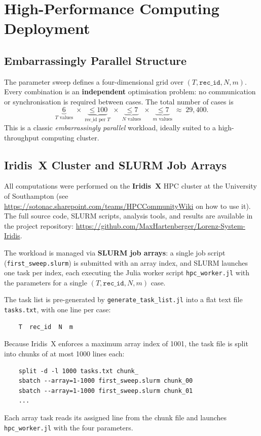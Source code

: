 \documentclass[11pt,a4paper]{article}
\begin{document}
\section{High-Performance Computing Deployment}

\subsection{Embarrassingly Parallel Structure}
The parameter sweep defines a four-dimensional grid over
$(T, \texttt{rec\_id}, N, m)$.  Every combination is an \textbf{independent}
optimisation problem: no communication or synchronisation is required between
cases.  The total number of cases is
\begin{equation}
  \underbrace{6}_{T\text{ values}}
  \;\times\;
  \underbrace{\le 100}_{\text{rec\_id per }T}
  \;\times\;
  \underbrace{\le 7}_{N\text{ values}}
  \;\times\;
  \underbrace{\le 7}_{m\text{ values}}
  \;\approx\; 29,\!400.
\end{equation}
This is a classic \emph{embarrassingly parallel} workload, ideally suited to
a high-throughput computing cluster.

\subsection{Iridis~X Cluster and SLURM Job Arrays}
All computations were performed on the \textbf{Iridis~X} HPC cluster at the
University of Southampton (see \url{https://sotonac.sharepoint.com/teams/HPCCommunityWiki} on how to use it).  The full source code, SLURM scripts, analysis
tools, and results are available in the project repository:
\url{https://github.com/MaxHartenberger/Lorenz-System-Iridis}.

The workload is managed via \textbf{SLURM job
arrays}: a single job script (\texttt{first\_sweep.slurm}) is submitted with
an array index, and SLURM launches one task per index, each executing the
Julia worker script \texttt{hpc\_worker.jl} with the parameters for a single
$(T, \texttt{rec\_id}, N, m)$ case.

The task list is pre-generated by \texttt{generate\_task\_list.jl} into a
flat text file \texttt{tasks.txt}, with one line per case:
\begin{verbatim}
    T  rec_id  N  m
\end{verbatim}
Because Iridis~X enforces a maximum array index of 1001, the task file is
split into chunks of at most 1000 lines each:
\begin{verbatim}
    split -d -l 1000 tasks.txt chunk_
    sbatch --array=1-1000 first_sweep.slurm chunk_00
    sbatch --array=1-1000 first_sweep.slurm chunk_01
    ...
\end{verbatim}
Each array task reads its assigned line from the chunk file and launches
\texttt{hpc\_worker.jl} with the four parameters.
\end{document}
